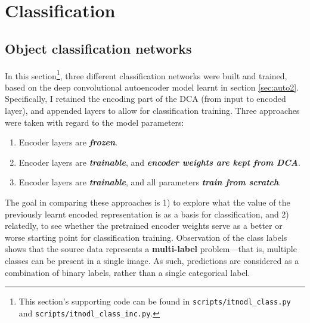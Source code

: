 

\section{Classification}
\label{sec:class}




\subsection{Object classification networks}
\label{sec:class1}

In this section\footnote{This section's supporting code can be found in \texttt{scripts/itnodl\_class.py} and \texttt{scripts/itnodl\_class\_inc.py}.}, three different classification networks were built and trained, based on the deep convolutional autoencoder model learnt in section \textcolor{blue}{\ref{sec:auto2}}. Specifically, I retained the encoding part of the DCA (from input to encoded layer), and appended layers to allow for classification training. Three approaches were taken with regard to the model parameters:

\begin{enumerate}

	\item{Encoder layers are \textbf{\textsl{frozen}}.}
	\item{Encoder layers are \textbf{\textsl{trainable}}, and \textbf{\textsl{encoder weights are kept from DCA}}.}
	\item{Encoder layers are \textbf{\textsl{trainable}}, and all parameters \textbf{\textsl{train from scratch}}.}

\end{enumerate}

The goal in comparing these approaches is 1) to explore what the value of the previously learnt encoded representation is as a basis for classification, and 2) relatedly, to see whether the pretrained encoder weights serve as a better or worse starting point for classification training. Observation of the class labels shows that the source data represents a \textbf{multi-label} problem---that is, multiple classes can be present in a single image. As such, predictions are considered as a combination of binary labels, rather than a single categorical label. 

\vspace{5mm}


